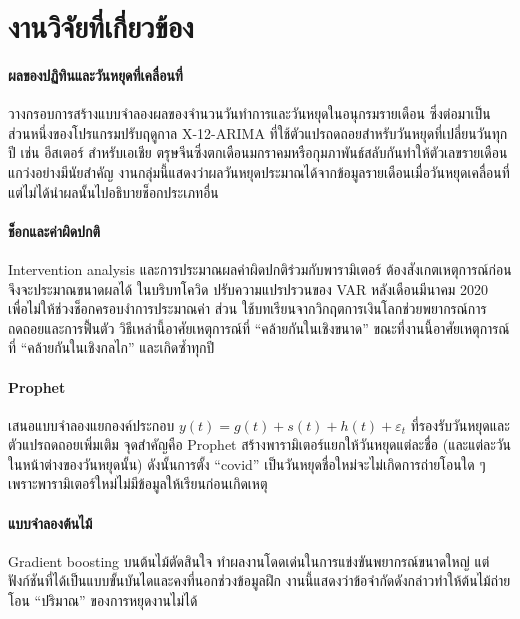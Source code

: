 \documentclass{article}
\theoremstyle{definition}
\begin{document}
\section{งานวิจัยที่เกี่ยวข้อง}
\paragraph{ผลของปฏิทินและวันหยุดที่เคลื่อนที่}
\citet{bell1983calendar} วางกรอบการสร้างแบบจำลองผลของจำนวนวันทำการและวันหยุดในอนุกรมรายเดือน ซึ่งต่อมาเป็นส่วนหนึ่งของโปรแกรมปรับฤดูกาล X-12-ARIMA \citep{findley1998x12} ที่ใช้ตัวแปรถดถอยสำหรับวันหยุดที่เปลี่ยนวันทุกปี เช่น อีสเตอร์ สำหรับเอเชีย ตรุษจีนซึ่งตกเดือนมกราคมหรือกุมภาพันธ์สลับกันทำให้ตัวเลขรายเดือนแกว่งอย่างมีนัยสำคัญ \citep{lin2003lunar} งานกลุ่มนี้แสดงว่าผลวันหยุดประมาณได้จากข้อมูลรายเดือนเมื่อวันหยุดเคลื่อนที่ แต่ไม่ได้นำผลนั้นไปอธิบายช็อกประเภทอื่น

\paragraph{ช็อกและค่าผิดปกติ}
Intervention analysis \citep{box1975intervention} และการประมาณผลค่าผิดปกติร่วมกับพารามิเตอร์ \citep{chen1993joint} ต้องสังเกตเหตุการณ์ก่อนจึงจะประมาณขนาดผลได้ ในบริบทโควิด \citet{lenza2022var} ปรับความแปรปรวนของ VAR หลังเดือนมีนาคม 2020 เพื่อไม่ให้ช่วงช็อกครอบงำการประมาณค่า ส่วน \citet{foroni2022covid} ใช้บทเรียนจากวิกฤตการเงินโลกช่วยพยากรณ์การถดถอยและการฟื้นตัว วิธีเหล่านี้อาศัยเหตุการณ์ที่ “คล้ายกันในเชิงขนาด” ขณะที่งานนี้อาศัยเหตุการณ์ที่ “คล้ายกันในเชิงกลไก” และเกิดซ้ำทุกปี

\paragraph{Prophet}
\citet{taylor2018forecasting} เสนอแบบจำลองแยกองค์ประกอบ $y(t)=g(t)+s(t)+h(t)+\varepsilon_t$ ที่รองรับวันหยุดและตัวแปรถดถอยเพิ่มเติม จุดสำคัญคือ Prophet สร้างพารามิเตอร์แยกให้วันหยุดแต่ละชื่อ (และแต่ละวันในหน้าต่างของวันหยุดนั้น) ดังนั้นการตั้ง “covid” เป็นวันหยุดชื่อใหม่จะไม่เกิดการถ่ายโอนใด ๆ เพราะพารามิเตอร์ใหม่ไม่มีข้อมูลให้เรียนก่อนเกิดเหตุ

\paragraph{แบบจำลองต้นไม้}
Gradient boosting บนต้นไม้ตัดสินใจ \citep{ke2017lightgbm} ทำผลงานโดดเด่นในการแข่งขันพยากรณ์ขนาดใหญ่ \citep{makridakis2022m5} แต่ฟังก์ชันที่ได้เป็นแบบขั้นบันไดและคงที่นอกช่วงข้อมูลฝึก \citep{januschowski2022trees} งานนี้แสดงว่าข้อจำกัดดังกล่าวทำให้ต้นไม้ถ่ายโอน “ปริมาณ” ของการหยุดงานไม่ได้
\end{document}
